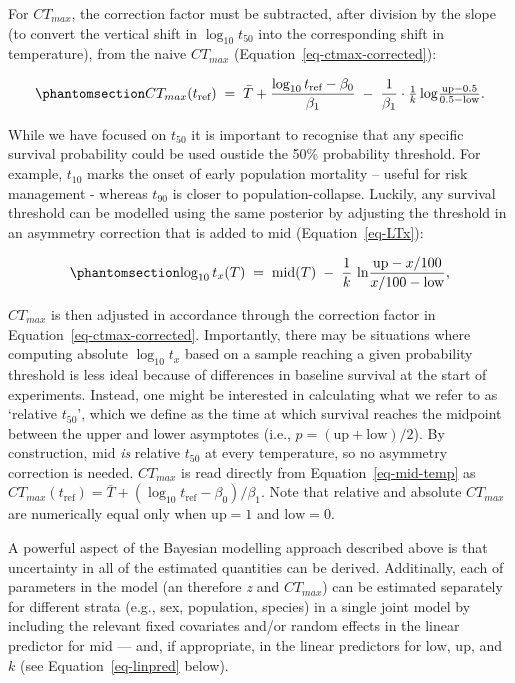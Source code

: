 \documentclass[
  11pt,
]{article}
\begin{document}
For \(CT_{max}\), the correction factor must be subtracted, after
division by the slope (to convert the vertical shift in
\(\log_{10}t_{50}\) into the corresponding shift in temperature), from
the naive \(CT_{max}\) (Equation~\ref{eq-ctmax-corrected}):

\begin{equation}\phantomsection\label{eq-ctmax-corrected}{
CT_{max}(t_\text{ref}) \;=\; \bar{T} + \frac{\log_{10} t_\text{ref} - \beta_0}{\beta_1} \;-\; \frac{1}{\beta_1}\cdot\tfrac{1}{k}\log\!\tfrac{\text{up} - 0.5}{0.5 - \text{low}}.
}\end{equation}

While we have focused on \(t_{50}\) it is important to recognise that
any specific survival probability could be used oustide the 50\%
probability threshold. For example, \(t_{10}\) marks the onset of early
population mortality -- useful for risk management - whereas \(t_{90}\)
is closer to population-collapse. Luckily, any survival threshold can be
modelled using the same posterior by adjusting the threshold in an
asymmetry correction that is added to \(\text{mid}\)
(Equation~\ref{eq-LTx}):

\begin{equation}\phantomsection\label{eq-LTx}{
\log_{10} t_x(T) \;=\; \text{mid}(T) \;-\; \frac{1}{k}\,\ln\!\frac{\text{up} - x/100}{x/100 - \text{low}},
}\end{equation}

\(CT_{max}\) is then adjusted in accordance through the correction
factor in Equation~\ref{eq-ctmax-corrected}. Importantly, there may be
situations where computing absolute \(\log_{10} t_{x}\) based on a
sample reaching a given probability threshold is less ideal because of
differences in baseline survival at the start of experiments. Instead,
one might be interested in calculating what we refer to as `relative
\(t_{50}\)', which we define as the time at which survival reaches the
midpoint between the upper and lower asymptotes (i.e.,
\(p = (\text{up}+\text{low})/2\)). By construction, \(\text{mid}\)
\emph{is} relative \(t_{50}\) at every temperature, so no asymmetry
correction is needed. \(CT_{max}\) is read directly from
Equation~\ref{eq-mid-temp} as
\(CT_{max}(t_\text{ref}) = \bar{T} + (\log_{10}t_\text{ref}-\beta_0)/\beta_1\).
Note that relative and absolute \(CT_{max}\) are numerically equal only
when \(\text{up}=1\) and \(\text{low}=0\).

A powerful aspect of the Bayesian modelling approach described above is
that uncertainty in all of the estimated quantities can be derived.
Additinally, each of parameters in the model (an therefore \emph{z} and
\(CT_{max}\)) can be estimated separately for different strata (e.g.,
sex, population, species) in a single joint model by including the
relevant fixed covariates and/or random effects in the linear predictor
for \(\text{mid}\) --- and, if appropriate, in the linear predictors for
\(\text{low}\), \(\text{up}\), and \(k\) (see Equation~\ref{eq-linpred}
below).
\end{document}
